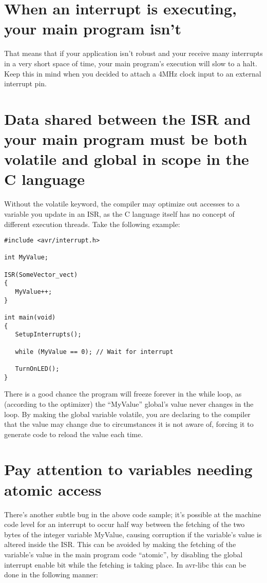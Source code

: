 \documentclass[a4paper,oneside,notitlepage]{book}
\begin{document}
\section{When an interrupt is executing, your main program isn't}
That means that if your application isn't robust and your receive many interrupts in a very short space of time, your main program's execution will slow to a halt. Keep this in mind when you decided to attach a 4MHz clock input to an external interrupt pin.

\section{Data shared between the ISR and your main program must be both volatile and global in scope in the C language}
Without the volatile keyword, the compiler may optimize out accesses to a variable you update in an ISR, as the C language itself has no concept of different execution threads. Take the following example:

\begin{center}
\begin{lstlisting}
#include <avr/interrupt.h>

int MyValue;

ISR(SomeVector_vect)
{
   MyValue++;
}

int main(void)
{
   SetupInterrupts();

   while (MyValue == 0); // Wait for interrupt

   TurnOnLED();
}
\end{lstlisting}
\end{center}

There is a good chance the program will freeze forever in the while loop, as (according to the optimizer) the ``MyValue'' global's value never changes in the loop. By making the global variable volatile, you are declaring to the compiler that the value may change due to circumstances it is not aware of, forcing it to generate code to reload the value each time.

\section{Pay attention to variables needing atomic access}
There's another subtle bug in the above code sample; it's possible at the machine code level for an interrupt to occur half way between the fetching of the two bytes of the integer variable MyValue, causing corruption if the variable's value is altered inside the ISR. This can be avoided by making the fetching of the variable's value in the main program code ``atomic'', by disabling the global interrupt enable bit while the fetching is taking place. In avr-libc this can be done in the following manner:
\end{document}

